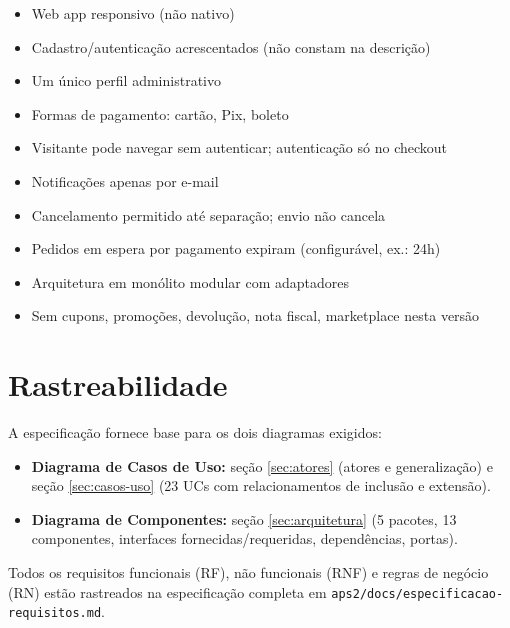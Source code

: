 \documentclass[12pt,a4paper]{article}
\providecommand{\tightlist}{%
  \setlength{\itemsep}{0pt}\setlength{\parskip}{0pt}}
\begin{document}
\begin{itemize}
\tightlist
\item Web app responsivo (não nativo)
\item Cadastro/autenticação acrescentados (não constam na descrição)
\item Um único perfil administrativo
\item Formas de pagamento: cartão, Pix, boleto
\item Visitante pode navegar sem autenticar; autenticação só no checkout
\item Notificações apenas por e-mail
\item Cancelamento permitido até separação; envio não cancela
\item Pedidos em espera por pagamento expiram (configurável, ex.: 24h)
\item Arquitetura em monólito modular com adaptadores
\item Sem cupons, promoções, devolução, nota fiscal, marketplace nesta versão
\end{itemize}

\section{Rastreabilidade}\label{sec:rastreabilidade}

A especificação fornece base para os dois diagramas exigidos:

\begin{itemize}
\tightlist
\item \textbf{Diagrama de Casos de Uso:} seção \ref{sec:atores} (atores e
  generalização) e seção \ref{sec:casos-uso} (23 UCs com relacionamentos
  de inclusão e extensão).
\item \textbf{Diagrama de Componentes:} seção \ref{sec:arquitetura}
  (5 pacotes, 13 componentes, interfaces fornecidas/requeridas, dependências,
  portas).
\end{itemize}

Todos os requisitos funcionais (RF), não funcionais (RNF) e regras de
negócio (RN) estão rastreados na especificação completa em
\texttt{aps2/docs/especificacao-requisitos.md}.
\end{document}
